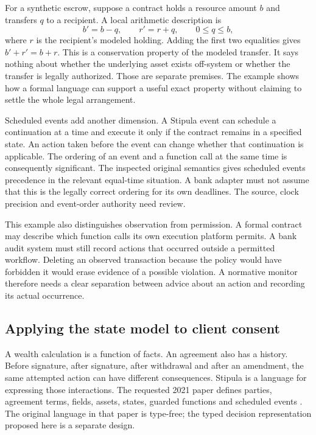 \documentclass[12pt,a4paper,oneside,openany]{book}
\begin{document}
For a synthetic escrow, suppose a contract holds a resource amount $b$ and
transfers $q$ to a recipient. A local arithmetic description is
\begin{equation}
 b'=b-q,\qquad r'=r+q,\qquad 0\leq q\leq b,
 \label{eq:asset-transfer}
\end{equation}
where $r$ is the recipient's modeled holding. Adding the first two equalities
gives $b'+r'=b+r$. This is a conservation property of the modeled transfer.
It says nothing about whether the underlying asset exists off-system or whether
the transfer is legally authorized. Those are separate premises. The example
shows how a formal language can support a useful exact property without
claiming to settle the whole legal arrangement.

Scheduled events add another dimension. A Stipula event can schedule a
continuation at a time and execute it only if the contract remains in a
specified state. An action taken before the event can change whether that
continuation is applicable. The ordering of an event and a function call at
the same time is consequently significant. The inspected original semantics
gives scheduled events precedence in the relevant equal-time situation. A bank
adapter must not assume that this is the legally correct ordering for its own
deadlines. The source, clock precision and event-order authority need review.

This example also distinguishes observation from permission. A formal contract
may describe which function calls its own execution platform permits. A bank
audit system must still record actions that occurred outside a permitted
workflow. Deleting an observed transaction because the policy would have
forbidden it would erase evidence of a possible violation. A normative monitor
therefore needs a clear separation between advice about an action and recording
its actual occurrence.

\subsection{Applying the state model to client consent}
\label{merge:P-01a-language-lesson:03}

\label{sec:stipula-tutorial}

A wealth calculation is a function of facts. An agreement also has a history.
Before signature, after signature, after withdrawal and after an amendment, the
same attempted action can have different consequences. Stipula is a language
for expressing those interactions. The requested 2021 paper defines parties,
agreement terms, fields, assets, states, guarded functions and scheduled events
\citep[secs.~3--4]{stipula2021}. The original language in that paper is
type-free; the typed decision representation proposed here is a separate design.
\end{document}
